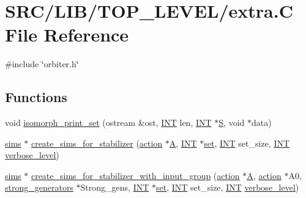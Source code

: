 \hypertarget{extra_8_c}{}\section{S\+R\+C/\+L\+I\+B/\+T\+O\+P\+\_\+\+L\+E\+V\+E\+L/extra.C File Reference}
\label{extra_8_c}
{\ttfamily \#include \char`\"{}orbiter.\+h\char`\"{}}\newline
\subsection*{Functions}
\begin{DoxyCompactItemize}
\item 
void \mbox{\hyperlink{extra_8_c_a31c112d9eb7e00d3856052d9debfda70}{isomorph\+\_\+print\+\_\+set}} (ostream \&ost, \mbox{\hyperlink{galois_8h_a09fddde158a3a20bd2dcadb609de11dc}{I\+NT}} len, \mbox{\hyperlink{galois_8h_a09fddde158a3a20bd2dcadb609de11dc}{I\+NT}} $\ast$\mbox{\hyperlink{simeon_8_c_adab47f8243f1b5a2c31df2535d6b37d0}{S}}, void $\ast$data)
\item 
\mbox{\hyperlink{classsims}{sims}} $\ast$ \mbox{\hyperlink{extra_8_c_af2c67d225072549409be710ac3cd30f8}{create\+\_\+sims\+\_\+for\+\_\+stabilizer}} (\mbox{\hyperlink{classaction}{action}} $\ast$\mbox{\hyperlink{simeon_8_c_a97833f04c3a9c008df5521a2fc291bb4}{A}}, \mbox{\hyperlink{galois_8h_a09fddde158a3a20bd2dcadb609de11dc}{I\+NT}} $\ast$\mbox{\hyperlink{nauty_8h_a9690bea211101f22a5e154087590c3da}{set}}, \mbox{\hyperlink{galois_8h_a09fddde158a3a20bd2dcadb609de11dc}{I\+NT}} set\+\_\+size, \mbox{\hyperlink{galois_8h_a09fddde158a3a20bd2dcadb609de11dc}{I\+NT}} \mbox{\hyperlink{simeon_8_c_a818073fbcc2f439e7c56952f67386122}{verbose\+\_\+level}})
\item 
\mbox{\hyperlink{classsims}{sims}} $\ast$ \mbox{\hyperlink{extra_8_c_af5482567a8d6ba5c2fe593bf6f7f9a0f}{create\+\_\+sims\+\_\+for\+\_\+stabilizer\+\_\+with\+\_\+input\+\_\+group}} (\mbox{\hyperlink{classaction}{action}} $\ast$\mbox{\hyperlink{simeon_8_c_a97833f04c3a9c008df5521a2fc291bb4}{A}}, \mbox{\hyperlink{classaction}{action}} $\ast$A0, \mbox{\hyperlink{classstrong__generators}{strong\+\_\+generators}} $\ast$Strong\+\_\+gens, \mbox{\hyperlink{galois_8h_a09fddde158a3a20bd2dcadb609de11dc}{I\+NT}} $\ast$\mbox{\hyperlink{nauty_8h_a9690bea211101f22a5e154087590c3da}{set}}, \mbox{\hyperlink{galois_8h_a09fddde158a3a20bd2dcadb609de11dc}{I\+NT}} set\+\_\+size, \mbox{\hyperlink{galois_8h_a09fddde158a3a20bd2dcadb609de11dc}{I\+NT}} \mbox{\hyperlink{simeon_8_c_a818073fbcc2f439e7c56952f67386122}{verbose\+\_\+level}})

\end{DoxyCompactItemize}

